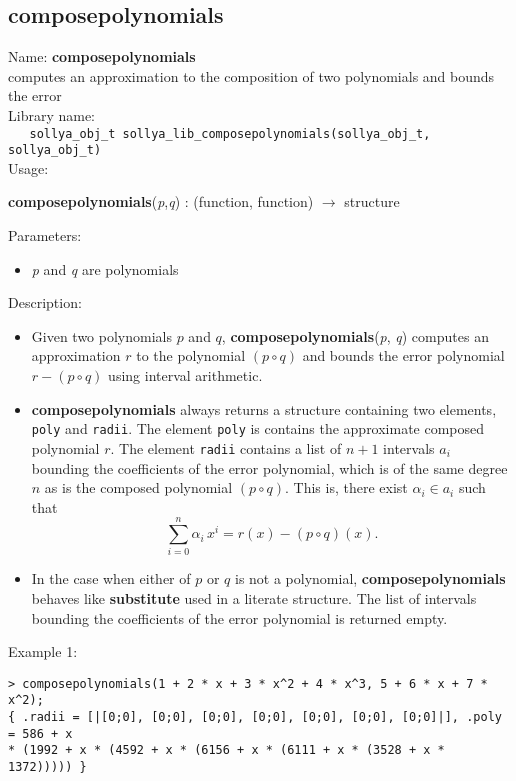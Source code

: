 \subsection{composepolynomials}
\label{labcomposepolynomials}
\noindent Name: \textbf{composepolynomials}\\
\phantom{aaa}computes an approximation to the composition of two polynomials and bounds the error\\[0.2cm]
\noindent Library name:\\
\verb|   sollya_obj_t sollya_lib_composepolynomials(sollya_obj_t, sollya_obj_t)|\\[0.2cm]
\noindent Usage: 
\begin{center}
\textbf{composepolynomials}(\emph{p},\emph{q}) : (\textsf{function}, \textsf{function}) $\rightarrow$ \textsf{structure}\\
\end{center}
Parameters: 
\begin{itemize}
\item \emph{p} and \emph{q} are polynomials
\end{itemize}
\noindent Description: \begin{itemize}

\item Given two polynomials $p$ and $q$, \textbf{composepolynomials}(\emph{p}, \emph{q}) computes an 
   approximation $r$ to the polynomial $(p \circ q)$ and bounds the
   error polynomial $r - (p \circ q)$ using interval arithmetic.

\item \textbf{composepolynomials} always returns a structure containing two elements,
   \texttt{poly} and \texttt{radii}.  The element
   \texttt{poly} is contains the approximate composed polynomial
   $r$. The element \texttt{radii} contains a list of $n + 1$ 
   intervals $a_i$ bounding the coefficients of the
   error polynomial, which is of the same degree $n$ as is the
   composed polynomial $(p \circ q)$.  This is, there exist
   $\alpha_i \in a_i$ such that 
   $$\sum\limits_{i=0}^n \alpha_i \, x^i = r(x) - (p \circ q)(x).$$

\item In the case when either of $p$ or $q$ is not a polynomial, \textbf{composepolynomials}
   behaves like \textbf{substitute} used in a literate structure. The list of intervals
   bounding the coefficients of the error polynomial is returned empty.
\end{itemize}
\noindent Example 1: 
\begin{center}\begin{minipage}{15cm}\begin{Verbatim}[frame=single,commandchars=\\\|\~]
> composepolynomials(1 + 2 * x + 3 * x^2 + 4 * x^3, 5 + 6 * x + 7 * x^2);
{ .radii = [|[0;0], [0;0], [0;0], [0;0], [0;0], [0;0], [0;0]|], .poly = 586 + x 
* (1992 + x * (4592 + x * (6156 + x * (6111 + x * (3528 + x * 1372))))) }
\end{Verbatim}
\end{minipage}\end{center}

